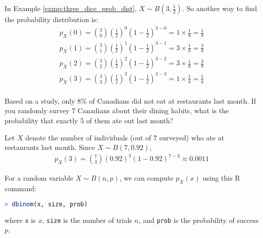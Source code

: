 \begin{exmp}
    In Example \autoref{exmp:three_dice_prob_dist}, \( X \sim B(3, \frac{1}{2}) \).
    So another way to find the probability distribution is:
    \begin{gather*}
        p_{X}(0) = \binom{3}{0} (\frac{1}{2})^0 (1 - \frac{1}{2})^{3 - 0} = 1 \times \frac{1}{8} = \frac{1}{8}\\
        p_{X}(1) = \binom{3}{1} (\frac{1}{2})^1 (1 - \frac{1}{2})^{3 - 1} = 3 \times \frac{1}{8} = \frac{3}{8}\\
        p_{X}(2) = \binom{3}{2} (\frac{1}{2})^2 (1 - \frac{1}{2})^{3 - 2} = 3 \times \frac{1}{8} = \frac{3}{8}\\
        p_{X}(3) = \binom{3}{3} (\frac{1}{2})^3 (1 - \frac{1}{2})^{3 - 3} = 1 \times \frac{1}{8} = \frac{1}{8}\\
    \end{gather*}
\end{exmp}
\begin{exmp}
    Based on a study, only 8\% of Canadians did not eat at restaurants last month.
    If you randomly survey 7 Canadians about their dining habits,
    what is the probability that exactly 5 of them ate out last month?
\end{exmp}
\begin{solution}
    Let \( X \) denote the number of individuals (out of 7 surveyed) who ate at restaurants last month.
    Since \( X \sim B(7, 0.92) \),
    \begin{gather*}
        p_{X}(3) = \binom{7}{3} (0.92)^3 (1 - 0.92)^{7 - 3} \approx 0.0011
    \end{gather*}
\end{solution}
For a random variable \( X \sim B(n, p) \), we can compute \( p_{X}(x) \) using this R command:
\begin{lstlisting}[language=R]
> dbinom(x, size, prob)
\end{lstlisting}
where \verb|x| is \( x \), \verb|size| is the number of trials \( n \), and \verb|prob| is the probability of success \( p \).

